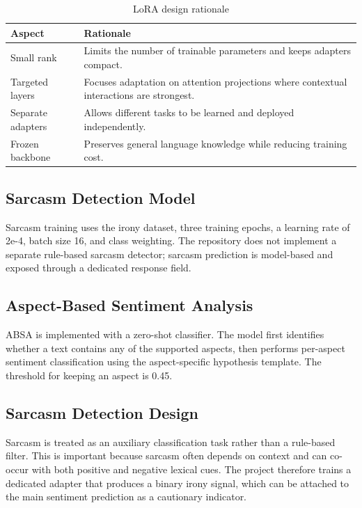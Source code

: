\documentclass[12pt, a4paper]{article}
\begin{document}
\begin{table}[H]
\centering
\caption{LoRA design rationale}
\begin{tabularx}{\textwidth}{@{} p{3.2cm} X @{}}
\toprule
\textbf{Aspect} & \textbf{Rationale} \\
\midrule
Small rank & Limits the number of trainable parameters and keeps adapters compact. \\
Targeted layers & Focuses adaptation on attention projections where contextual interactions are strongest. \\
Separate adapters & Allows different tasks to be learned and deployed independently. \\
Frozen backbone & Preserves general language knowledge while reducing training cost. \\
\bottomrule
\end{tabularx}
\end{table}

\subsection{Sarcasm Detection Model}
Sarcasm training uses the irony dataset, three training epochs, a learning rate of 2e-4, batch size 16, and class weighting. The repository does not implement a separate rule-based sarcasm detector; sarcasm prediction is model-based and exposed through a dedicated response field.

\subsection{Aspect-Based Sentiment Analysis}
ABSA is implemented with a zero-shot classifier. The model first identifies whether a text contains any of the supported aspects, then performs per-aspect sentiment classification using the aspect-specific hypothesis template. The threshold for keeping an aspect is 0.45.

\subsection{Sarcasm Detection Design}
Sarcasm is treated as an auxiliary classification task rather than a rule-based filter. This is important because sarcasm often depends on context and can co-occur with both positive and negative lexical cues. The project therefore trains a dedicated adapter that produces a binary irony signal, which can be attached to the main sentiment prediction as a cautionary indicator.
\end{document}
